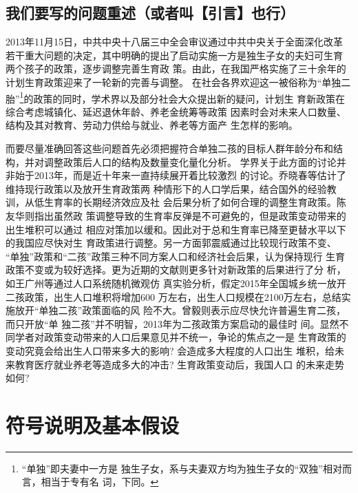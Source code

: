 \documentclass[a4paper]{article}
\begin{document}
\subsection{我们要写的问题重述（或者叫【引言】也行）}
2013年11月15日，中共中央十八届三中全会审议通过中共中央关于全面深化改革
若干重大问题的决定，其中明确的提出了启动实施一方是独生子女的夫妇可生育
两个孩子的政策，逐步调整完善生育政
策。由此，在我国严格实施了三十余年的计划生育政策迎来了一轮新的完善与调整。
在社会各界欢迎这一被俗称为“单独二胎”\footnote{``单独''即夫妻中一方是
  独生子女，系与夫妻双方均为独生子女的``双独''相对而言，相当于专有名
  词，下同。}的政策的同时，学术界以及部分社会大众提出新的疑问，计划生
育新政策在综合考虑城镇化、延迟退休年龄、养老金统筹等政策
因素时会对未来人口数量、结构及其对教育、劳动力供给与就业、养老等方面产
生怎样的影响。\par
而要尽量准确回答这些问题首先必须把握符合单独二孩的目标人群年龄分布和结
构，并对调整政策后人口的结构及数量变化量化分析。
学界关于此方面的讨论并非始于2013年，而是近十年来一直持续展开着比较激烈
的讨论。乔晓春等\cite{xiaochun06}估计了维持现行政策以及放开生育政策两
种情形下的人口学后果，结合国外的经验教训，从低生育率的长期经济效应及社
会后果分析了如何合理的调整生育政策。陈友华\cite{youhua07}则指出虽然政
策调整导致的生育率反弹是不可避免的，但是政策变动带来的出生堆积可以通过
相应对策加以缓和。因此对于总和生育率已降至更替水平以下的我国应尽快对生
育政策进行调整。另一方面郭震威\cite{zhenwei09}通过比较现行政策不变、
``单独''政策和``二孩''政策三种不同方案人口和经济社会后果，认为保持现行
生育政策不变或为较好选择。更为近期的文献则更多针对新政策的后果进行了分
析，如王广州等\cite{guangzhou12}通过人口系统随机微观仿
真实验分析，假定2015年全国城乡统一放开二孩政策，出生人口堆积将增加600
万左右，出生人口规模在2100万左右，总结实施放开``单独二孩''政策面临的风
险不大。曾毅\cite{zengyi12}则表示应尽快允许普遍生育二孩，而只开放``单
独二孩''并不明智，2013年为二孩政策方案启动的最佳时
间。显然不同学者对政策变动带来的人口后果意见并不统一，争论的焦点之一是
生育政策的变动究竟会给出生人口带来多大的影响? 会造成多大程度的人口出生
堆积，给未来教育医疗就业养老等造成多大的冲击? 生育政策变动后，我国人口
的未来走势如何?\par
%
%
\section{符号说明及基本假设}
\end{document}
